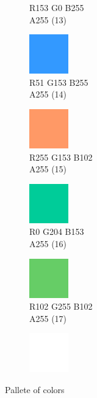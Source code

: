 \begin{figure}[!h]
\begin{subfigure}{0.105\textwidth}
		\vspace*{-20px} \caption*{\hspace*{-0.25px}\tiny R153 G0 B255 \\ \tiny A255 (13)}
	\end{subfigure}
	 \begin{subfigure}{0.105\textwidth}\centering
		\includegraphics[frame]{gui-imgs/R51G153B255A255}
		\vspace*{-20px} \caption*{\hspace*{-0.25px}\tiny R51 G153 B255 \\ \tiny A255 (14)}
	\end{subfigure}
	\begin{subfigure}{0.105\textwidth}\centering
		\includegraphics[frame]{gui-imgs/R255G153B102A255}
		\vspace*{-20px} \caption*{\hspace*{-0.25px}\tiny R255 G153 B102 \\ \tiny A255 (15)}
	\end{subfigure}
	\begin{subfigure}{0.105\textwidth}\centering
		\includegraphics[frame]{gui-imgs/R0G204B153A255}
		\vspace*{-20px} \caption*{\hspace*{-0.25px}\tiny R0 G204 B153 \\ \tiny A255 (16)}
	\end{subfigure}
	\begin{subfigure}{0.105\textwidth}\centering
		\includegraphics[frame]{gui-imgs/R102G255B102A255}
		\vspace*{-20px} \caption*{\hspace*{-0.25px}\tiny R102 G255 B102 \\ \tiny A255 (17)}
	\end{subfigure}
	\begin{subfigure}{0.105\textwidth}\centering
		\includegraphics{gui-imgs/R255G255B255A255}
	\end{subfigure}
	\caption{Pallete of colors}
\end{figure}

